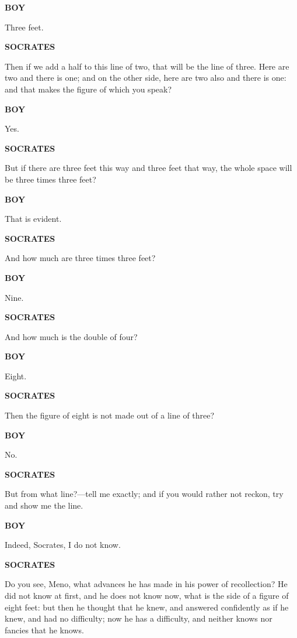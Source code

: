 \documentclass[11pt,letter]{article}
\begin{document}
\par \textbf{BOY}
\par   Three feet.

\par \textbf{SOCRATES}
\par   Then if we add a half to this line of two, that will be the line of three. Here are two and there is one; and on the other side, here are two also and there is one:  and that makes the figure of which you speak?

\par \textbf{BOY}
\par   Yes.

\par \textbf{SOCRATES}
\par   But if there are three feet this way and three feet that way, the whole space will be three times three feet?

\par \textbf{BOY}
\par   That is evident.

\par \textbf{SOCRATES}
\par   And how much are three times three feet?

\par \textbf{BOY}
\par   Nine.

\par \textbf{SOCRATES}
\par   And how much is the double of four?

\par \textbf{BOY}
\par   Eight.

\par \textbf{SOCRATES}
\par   Then the figure of eight is not made out of a line of three?

\par \textbf{BOY}
\par   No.

\par \textbf{SOCRATES}
\par   But from what line?—tell me exactly; and if you would rather not reckon, try and show me the line.

\par \textbf{BOY}
\par   Indeed, Socrates, I do not know.

\par \textbf{SOCRATES}
\par   Do you see, Meno, what advances he has made in his power of recollection? He did not know at first, and he does not know now, what is the side of a figure of eight feet:  but then he thought that he knew, and answered confidently as if he knew, and had no difficulty; now he has a difficulty, and neither knows nor fancies that he knows.
\end{document}
